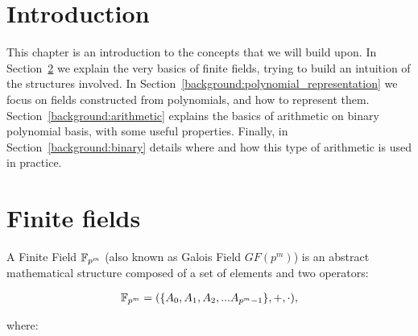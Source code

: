 \section{Introduction}

This chapter is an introduction to the concepts that we will build upon. In Section~\ref{background:finite_fields} we explain the very basics of finite fields, trying to build an intuition of the structures involved. In Section~\ref{background:polynomial_representation} we focus on fields constructed from polynomials, and how to represent them. Section~\ref{background:arithmetic} explains the basics of arithmetic on binary polynomial basis, with some useful properties. Finally, in Section~\ref{background:binary} details where and how this type of arithmetic is used in practice.



\section{Finite fields} \label{background:finite_fields}

A Finite Field $\mathbb{F}_{p^m}$ (also known as Galois Field $GF(p^m)$) is an abstract mathematical structure composed of a set of elements and two operators:

\begin{gather*}
\mathbb{F}_{p^m} = (\{A_0, A_1, A_2, ... A_{p^m-1}\}, +, \cdot),
\end{gather*}

where:

